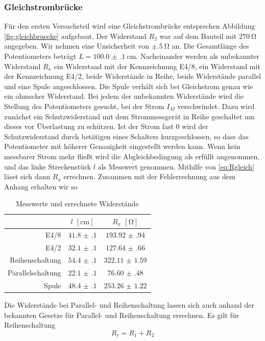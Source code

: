 \subsubsection{Gleichstrombrücke}
Für den ersten Versuchsteil wird eine Gleichstrombrücke entsprechen Abbildung \ref{fig:gleichbruecke} aufgebaut. Der Widerstand $ R_2 $ war auf dem Bauteil mit $ \SI{270}{\ohm} $ angegeben. Wir nehmen eine Unsicherheit von $ \pm\SI{.5}{\ohm} $ an. Die Gesamtlänge des Potentiometers beträgt $ L = \SI{100.0(1)}{\centi\meter} $. Nacheinander werden als unbekannter Widerstand $ R_x $ ein Widerstand mit der Kennzeichnung E4/8, ein Widerstand mit der Kennzeichnung E4/2, beide Widerstände in Reihe, beide Widerstände parallel und eine Spule angeschlossen. Die Spule verhält sich bei Gleichstrom genau wie ein ohmscher Widerstand. Bei jedem der unbekannten Widerstände wird die Stellung des Potentiometers gesucht, bei der Strom $ I_M $ verschwindet. Dazu wird zunächst ein Schutzwiderstand mit dem Strommessgerät in Reihe geschaltet um dieses vor Überlastung zu schützen. Ist der Strom fast $ 0 $ wird der Schutzwiderstand durch betätigen eines Schalters kurzgeschlossen, so dass das Potentiometer mit höherer Genauigkeit eingestellt werden kann. Wenn kein messbarer Strom mehr fließt wird die Abgleichbedingung als erfüllt angenommen, und das linke Streckenstück $ l $ als Messwert genommen. Mithilfe von \eqref{eq:Rgleich} lässt sich dann $ R_x $ errechnen. Zusammen mit der Fehlerrechnung aus dem Anhang erhalten wir so
\begin{table}[H]
	\centering
	\begin{tabular}{r|cc}
		 & $ l $ $ [\si{\centi\meter}] $ & $ R_x $ $ [\si{\ohm}] $ \\\hline
		E4/8 & $ \num{41.8(1)} $ & $ \num{193.92(94)} $\\
		E4/2 & $ \num{32.1(1)} $ & $ \num{127.64(66)} $\\
		Reihenschaltung & $ \num{54.4(1)} $ & $ \num{322.11(159)} $\\
		Parallelschaltung & $ \num{22.1(1)} $ & $ \num{76.60(48)} $\\
		Spule & $ \num{48.4(1)} $ & $ \num{253.26(122)} $
	\end{tabular}
	\caption{Messwerte und errechnete Widerstände}
\end{table}
Die Widerstände bei Parallel- und Reihenschaltung lassen sich auch anhand der bekannten Gesetze für Parallel- und Reihenschaltung errechnen. Es gilt für Reihenschaltung
\begin{equation*}
	R_r = R_1 + R_2
\end{equation*}
